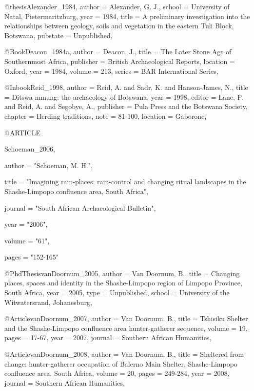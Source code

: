 
@thesis{Alexander_1984,
  author = {Alexander, G. J.},
  school = {University of Natal, Pietermaritzburg},
  year   = {1984},
  title  = {A preliminary investigation into the relationships between geology, soils and vegetation in the eastern Tuli Block, Botswana},
  pubstate   = {Unpublished},
}

@Book{Deacon_1984a,
  author    = {Deacon, J.},
  title     = {The Later Stone Age of Southernmost Africa},
  publisher = {British Archaeological Reports},
  location  = {Oxford},
  year      = {1984},
  volume    = {213},
  series    = {BAR International Series},
}

@Inbook{Reid_1998,
  author    = {Reid, A. and Sadr, K. and Hanson-James, N.},
  title     = {Ditswa mmung: the archaeology of Botswana},
  year      = {1998},
  editor    = {Lane, P. and Reid, A. and Segobye, A.},
  publisher = {Pula Press and the Botswana Society},
  chapter   = {Herding traditions},
  note      = {81-100},
  location  = {Gaborone},
}


@ARTICLE {Schoeman_2006,

author  = "Schoeman, M. H.",

title   = "Imagining rain-places: rain-control and changing ritual landscapes in the Shashe-Limpopo confluence area, South Africa",

journal = "South African Archaeological Bulletin",

year    = "2006",

volume  = "61",

pages   = "152-165"

}

@PhdThesis{vanDoornum_2005,
  author = {Van Doornum, B.},
  title  = {Changing places, spaces and identity in the Shashe-Limpopo region of Limpopo Province, South Africa},
  year   = {2005},
  type   = {Unpublished},
  school = {University of the Witwatersrand, Johanesburg},
}

@Article{vanDoornum_2007,
  author  = {Van Doornum, B.},
  title   = {Tshisiku Shelter and the Shashe-Limpopo confluence area hunter-gatherer sequence},
  volume  = {19},
  pages   = {17-67},
  year    = {2007},
  journal = {Southern African Humanities},
}

@Article{vanDoornum_2008,
  author  = {Van Doornum, B.},
  title   = {Sheltered from change: hunter-gatherer occupation of Balerno Main Shelter, Shashe-Limpopo confluence area, South Africa},
  volume  = {20},
  pages   = {249-284},
  year    = {2008},
  journal = {Southern African Humanities},
}

